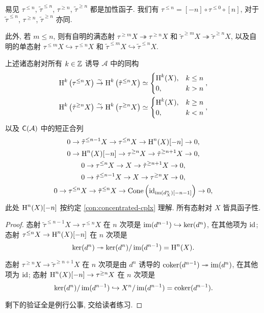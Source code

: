 易见 $\tau^{\leq n}$, $\tilde{\tau}^{\leq n}$, $\tau^{\geq n}$, $\tilde{\tau}^{\geq n}$ 都是加性函子. 我们有  $\tau^{\leq n} = [-n] \circ \tau^{\leq 0} \circ [n]$, 对于 $\tilde{\tau}^{\leq n}$, $\tau^{\geq n}$, $\tilde{\tau}^{\geq n}$ 亦同.

此外, 若 $m \leq n$, 则有自明的满态射 $\tau^{\geq m} X \twoheadrightarrow \tau^{\geq n} X$ 和 $\tilde{\tau}^{\geq m} X \twoheadrightarrow \tilde{\tau}^{\geq n} X$, 以及自明的单态射 $\tau^{\leq m} X \hookrightarrow \tau^{\leq n} X$ 和 $\tilde{\tau}^{\leq m} X \hookrightarrow \tilde{\tau}^{\leq n} X$.

\begin{lemma}\label{prop:truncation-ses}
	上述诸态射对所有 $k \in \mathbb{Z}$ 诱导 $\mathcal{A}$ 中的同构
	\begin{align*}
		\operatorname{H}^k\left( \tau^{\leq n} X\right) & \stackrel{\sim}{\rightarrow} \operatorname{H}^k\left( \tilde{\tau}^{\leq n} X\right) \simeq \begin{cases} \operatorname{H}^k(X), & k \leq n \\ 0, & k > n \end{cases}, \\
		\operatorname{H}^k\left( \tilde{\tau}^{\geq n} X\right) & \stackrel{\sim}{\rightarrow} \operatorname{H}^k\left( \tau^{\geq n} X\right) \simeq \begin{cases} \operatorname{H}^k(X), & k \geq n \\ 0, & k < n \end{cases},
	\end{align*}
	以及 $\mathsf{C}(\mathcal{A})$ 中的短正合列
	\begin{equation*}\begin{gathered}
		0 \to \tilde{\tau}^{\leq n-1} X \to \tau^{\leq n} X \to \operatorname{H}^n(X)[-n] \to 0, \\
		0 \to \operatorname{H}^n(X)[-n] \to \tau^{\geq n} X \to \tilde{\tau}^{\geq n+1} X \to 0, \\
		0 \to \tau^{\leq n} X \to X \to \tilde{\tau}^{\geq n+1} X \to 0, \\
		0 \to \tilde{\tau}^{\leq n-1} X \to X \to \tau^{\geq n} X \to 0, \\
		0 \to \tau^{\leq n} X \to \tilde{\tau}^{\leq n} X \to \operatorname{Cone}\left(\mathrm{id}_{\operatorname{im}(d_X^n) [-n-1]} \right) \to 0,
	\end{gathered}\end{equation*}
	此处 $\operatorname{H}^n(X)[-n]$ 按约定 \ref{con:concentrated-cplx} 理解. 所有态射对 $X$ 皆具函子性.
\end{lemma}
\begin{proof}
	态射 $\tilde{\tau}^{\leq n-1} X \to \tau^{\leq n} X$ 在 $n$ 次项是 $\operatorname{im}(d^{n-1}) \hookrightarrow \operatorname{ker}(d^n)$, 在其他项为 $\mathrm{id}$; 态射 $\tau^{\leq n} X \to \operatorname{H}^n(X)[-n]$ 在 $n$ 次项是
	\[ \operatorname{ker}(d^n) \twoheadrightarrow \operatorname{ker}(d^n)/\operatorname{im}(d^{n-1}) = \operatorname{H}^n(X). \]
	
	态射 $\tau^{\geq n} X \to \tilde{\tau}^{\geq n+1} X$ 在 $n$ 次项是由 $d^n$ 诱导的 $\operatorname{coker}(d^{n-1}) \twoheadrightarrow \operatorname{im}(d^n)$, 在其他项为 $\mathrm{id}$; 态射 $\operatorname{H}^n(X)[-n] \to \tau^{\geq n} X$ 在 $n$ 次项是
	\[ \operatorname{ker}(d^n)/\operatorname{im}(d^{n-1}) \hookrightarrow X^n/\operatorname{im}(d^{n-1}) = \operatorname{coker}(d^{n-1}). \]
	
	剩下的验证全是例行公事, 交给读者练习.
\end{proof}

